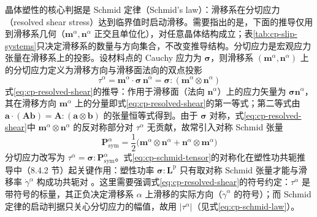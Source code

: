 晶体塑性的核心判据是 Schmid 定律（Schmid's law）：滑移系在分切应力（resolved shear stress）达到临界值时启动滑移。需要指出的是，下面的推导仅用到滑移系几何（$\mathbf{m}^{\alpha},\mathbf{n}^{\alpha}$ 正交且单位化），对任意晶体结构成立；表\ref{tab:cp-slip-systems}只决定滑移系的数量与方向集合，不改变推导结构。分切应力是宏观应力张量在滑移系上的投影。设材料点的 Cauchy 应力为 $\boldsymbol{\sigma}$，则滑移系 $(\mathbf{m}^{\alpha},\mathbf{n}^{\alpha})$ 上的分切应力定义为滑移方向与滑移面法向的双点投影
\begin{equation}
  \tau^{\alpha}=\mathbf{m}^{\alpha}\cdot\boldsymbol{\sigma}\,\mathbf{n}^{\alpha}
  =\boldsymbol{\sigma}:(\mathbf{m}^{\alpha}\otimes\mathbf{n}^{\alpha})
  \label{eq:cp-resolved-shear}
\end{equation}
式\eqref{eq:cp-resolved-shear}的推导：作用于滑移面（法向 $\mathbf{n}^{\alpha}$）上的应力矢量为 $\boldsymbol{\sigma}\mathbf{n}^{\alpha}$，其在滑移方向 $\mathbf{m}^{\alpha}$ 上的分量即式\eqref{eq:cp-resolved-shear}的第一等式；第二等式由 $\mathbf{a}\cdot(\mathbf{A}\mathbf{b})=\mathbf{A}:(\mathbf{a}\otimes\mathbf{b})$ 的张量恒等式得到。由于 $\boldsymbol{\sigma}$ 对称，式\eqref{eq:cp-resolved-shear}中 $\mathbf{m}^{\alpha}\otimes\mathbf{n}^{\alpha}$ 的反对称部分对 $\tau^{\alpha}$ 无贡献，故常引入对称 Schmid 张量
\begin{equation}
  \mathbf{P}^{\alpha}_{\mathrm{sym}}
  =\frac{1}{2}\bigl(\mathbf{m}^{\alpha}\otimes\mathbf{n}^{\alpha}+\mathbf{n}^{\alpha}\otimes\mathbf{m}^{\alpha}\bigr)
  \label{eq:cp-schmid-tensor}
\end{equation}
分切应力改写为 $\tau^{\alpha}=\boldsymbol{\sigma}:\mathbf{P}^{\alpha}_{\mathrm{sym}}$。式\eqref{eq:cp-schmid-tensor}的对称化在塑性功共轭推导中（8.4.2 节）起关键作用：塑性功率 $\boldsymbol{\sigma}:\mathbf{L}^{\mathrm{p}}$ 只有取对称 Schmid 张量才能与滑移率 $\dot{\gamma}^{\alpha}$ 构成功共轭对 \cite{Asaro1983}。这里需要强调式\eqref{eq:cp-resolved-shear}的符号约定：$\tau^{\alpha}$ 是带符号的标量，其正负决定滑移系 $\alpha$ 上滑移的实际方向（$\dot{\gamma}^{\alpha}$ 的符号）；而 Schmid 定律的启动判据只关心分切应力的幅值，故用 $|\tau^{\alpha}|$（见式\eqref{eq:cp-schmid-law}）。

